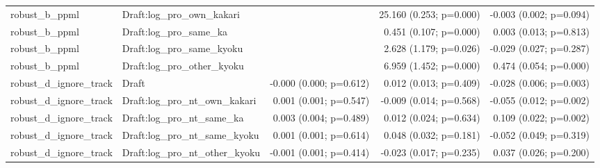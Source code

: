\begin{table}[!htbp]
\begin{tabular}{llrrr}
robust_b_ppml & Draft:log_pro_own_kakari &  & 25.160 (0.253; p=0.000) & -0.003 (0.002; p=0.094)
\\
robust_b_ppml & Draft:log_pro_same_ka &  & 0.451 (0.107; p=0.000) & 0.003 (0.013; p=0.813)
\\
robust_b_ppml & Draft:log_pro_same_kyoku &  & 2.628 (1.179; p=0.026) & -0.029 (0.027; p=0.287)
\\
robust_b_ppml & Draft:log_pro_other_kyoku &  & 6.959 (1.452; p=0.000) & 0.474 (0.054; p=0.000)
\\
robust_d_ignore_track & Draft & -0.000 (0.000; p=0.612) & 0.012 (0.013; p=0.409) & -0.028 (0.006; p=0.003)
\\
robust_d_ignore_track & Draft:log_pro_nt_own_kakari & 0.001 (0.001; p=0.547) & -0.009 (0.014; p=0.568) & -0.055 (0.012; p=0.002)
\\
robust_d_ignore_track & Draft:log_pro_nt_same_ka & 0.003 (0.004; p=0.489) & 0.012 (0.024; p=0.634) & 0.109 (0.022; p=0.002)
\\
robust_d_ignore_track & Draft:log_pro_nt_same_kyoku & 0.001 (0.001; p=0.614) & 0.048 (0.032; p=0.181) & -0.052 (0.049; p=0.319)
\\
robust_d_ignore_track & Draft:log_pro_nt_other_kyoku & -0.001 (0.001; p=0.414) & -0.023 (0.017; p=0.235) & 0.037 (0.026; p=0.200)
\\
\hline
\end{tabular}
\end{table}
